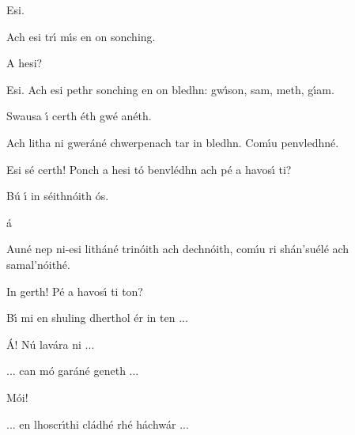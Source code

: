 \begin{leftbubbles}Esi.\end{leftbubbles}
\begin{rightbubbles}Ach esi tr\'{\i} m\'{\i}s en on sonching.\end{rightbubbles}
\begin{leftbubbles}A hesi?\end{leftbubbles}
\begin{rightbubbles}Esi. Ach esi pethr sonching en on bledhn: gw\'{\i}son, sam, meth, g\'{\i}am.\end{rightbubbles}
\begin{leftbubbles}Swausa \'{\i} certh \'{e}th gw\'{e} an\'{e}th.\end{leftbubbles}
\begin{rightbubbles}Ach litha ni gwer\'{a}n\'{e} chwerpenach tar in bledhn. Com\'{\i}u penvledhn\'{e}.\end{rightbubbles}
\begin{leftbubbles}Esi s\'{e} certh! Ponch a hesi t\'{o} benvl\'{e}dhn ach p\'{e} a havos\'{\i} ti?\end{leftbubbles}
\begin{rightbubbles}B\'{u} \'{\i} in s\'{e}ithn\'{o}ith \'{o}s.\end{rightbubbles}
\begin{leftbubbles}\'{a}\end{leftbubbles}
\begin{rightbubbles}Aun\'{e} nep ni-esi lith\'{a}n\'{e} trin\'{o}ith ach dechn\'{o}ith, com\'{\i}u ri sh\'{a}n’su\'{e}l\'{e} ach samal’n\'{o}ith\'{e}.\end{rightbubbles}
\begin{leftbubbles}In gerth! P\'{e} a havos\'{\i} ti ton?\end{leftbubbles}
\begin{rightbubbles}B\'{\i} mi en shuling dherthol \'{e}r in ten ...\end{rightbubbles}
\begin{leftbubbles}\'{A}! N\'{u} lav\'{a}ra ni ...\end{leftbubbles}
\begin{rightbubbles}... can m\'{o} gar\'{a}n\'{e} geneth ...\end{rightbubbles}
\begin{leftbubbles}M\'{o}i!\end{leftbubbles}
\begin{rightbubbles}... en lhoscr\'{\i}thi cl\'{a}dh\'{e} rh\'{e} h\'{a}chw\'{a}r ...\end{rightbubbles}
